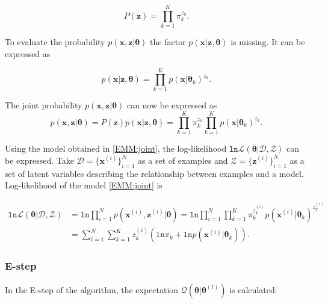 \begin{equation}
	P(\mathbf{z}) = \prod_{k=1}^K\pi_k^{z_k}.
\end{equation}

To evaluate the probability $p(\mathbf{x}, \mathbf{z} | \boldsymbol \theta)$  the factor $p(\mathbf{x}| \mathbf{z}, \boldsymbol \theta)$ is missing. It can be expressed as 

\begin{equation}
	p(\mathbf{x}| \mathbf{z}, \boldsymbol \theta) = \prod_{k=1}^{K}p(\mathbf{x}| \boldsymbol \theta_k)^{z_k}.
\end{equation}

The joint probability $p(\mathbf{x}, \mathbf{z} | \boldsymbol \theta)$ can now be expressed as 
\begin{equation}
	p(\mathbf{x}, \mathbf{z} | \boldsymbol \theta) = P(\mathbf{z})p(\mathbf{x}| \mathbf{z}, \boldsymbol \theta) = \prod_{k=1}^K\pi_{k}^{z_k}\prod_{k=1}^Kp(\mathbf{x}| \boldsymbol \theta_k)^{z_k}.
	\label{EMM:joint}
\end{equation}

Using the  model obtained in \ref{EMM:joint}, the log-likelihood $\mathtt{ln}\mathcal{L}(\boldsymbol \theta | \mathcal{D}, \mathcal{Z})$ can be expressed. Take $\mathcal{D} = \{ \mathbf{x}^(i) \}_{i=1}^N$ as a set of examples and $\mathcal{Z} = \{ \mathbf{z}^{(i)} \}_{i=1}^N$ as a set of latent variables describing the relationship between examples and a model. Log-likelihood of the model \ref{EMM:joint} is 

\begin{equation}
\begin{split}
	\mathtt{ln}\mathcal{L}(\boldsymbol \theta | \mathcal{D}, \mathcal{Z}) &= \mathtt{ln}\prod_{i=1}^N p(\mathbf{x}^{(i)}, \mathbf{z}^{(i)} | \boldsymbol \theta) = \mathtt{ln}\prod_{i=1}^N\prod_{k=1}^K \pi_k^{z_k^{(i)}}p(\mathbf{x}^{(i)} | \boldsymbol \theta_k)^{z_k^{(i)}} \\
	&= \sum_{i=1}^N \sum_{k=1}^Kz_k^{(i)} \left ( \mathtt{ln}\pi_k + \mathtt{ln}p(\mathbf{x}^{(i)} | \boldsymbol \theta_k)  \right ).
\end{split}
\end{equation}

\subsubsection{E-step}

In the E-step of the algorithm, the expectation $\mathcal{Q}(\boldsymbol \theta | \boldsymbol \theta^{(t)})$ is calculated:


